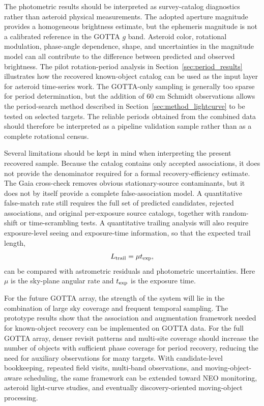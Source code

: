 \documentclass[referee]{raa}
\begin{document}
The photometric results should be interpreted as survey-catalog diagnostics rather than asteroid physical measurements. The adopted aperture magnitude provides a homogeneous brightness estimate, but the ephemeris magnitude is not a calibrated reference in the GOTTA $g$ band. Asteroid color, rotational modulation, phase-angle dependence, shape, and uncertainties in the magnitude model can all contribute to the difference between predicted and observed brightness. The pilot rotation-period analysis in Section~\ref{sec:period_results} illustrates how the recovered known-object catalog can be used as the input layer for asteroid time-series work. The GOTTA-only sampling is generally too sparse for period determination, but the addition of 60 cm Schmidt observations allows the period-search method described in Section~\ref{sec:method_lightcurve} to be tested on selected targets. The reliable periods obtained from the combined data should therefore be interpreted as a pipeline validation sample rather than as a complete rotational census.

Several limitations should be kept in mind when interpreting the present recovered sample. Because the catalog contains only accepted associations, it does not provide the denominator required for a formal recovery-efficiency estimate. The Gaia cross-check removes obvious stationary-source contaminants, but it does not by itself provide a complete false-association model. A quantitative false-match rate still requires the full set of predicted candidates, rejected associations, and original per-exposure source catalogs, together with random-shift or time-scrambling tests. A quantitative trailing analysis will also require exposure-level seeing and exposure-time information, so that the expected trail length,
\begin{equation}
L_{\rm trail}=\mu t_{\rm exp},
\end{equation}
can be compared with astrometric residuals and photometric uncertainties. Here $\mu$ is the sky-plane angular rate and $t_{\rm exp}$ is the exposure time.

For the future GOTTA array, the strength of the system will lie in the combination of large sky coverage and frequent temporal sampling. The prototype results show that the association and augmentation framework needed for known-object recovery can be implemented on GOTTA data. For the full GOTTA array, denser revisit patterns and multi-site coverage should increase the number of objects with sufficient phase coverage for period recovery, reducing the need for auxiliary observations for many targets. With candidate-level bookkeeping, repeated field visits, multi-band observations, and moving-object-aware scheduling, the same framework can be extended toward NEO monitoring, asteroid light-curve studies, and eventually discovery-oriented moving-object processing.
\end{document}

